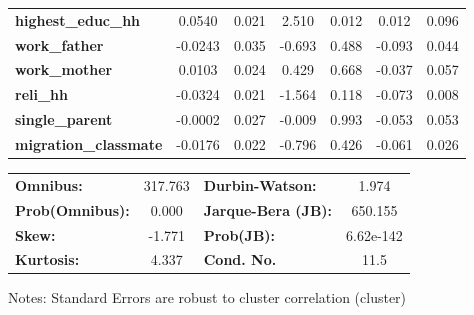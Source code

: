 \begin{center}
\begin{tabular}{lcccccc}
\textbf{highest\_educ\_hh}    &       0.0540  &        0.021     &     2.510  &         0.012        &        0.012    &        0.096     \\
\textbf{work\_father}         &      -0.0243  &        0.035     &    -0.693  &         0.488        &       -0.093    &        0.044     \\
\textbf{work\_mother}         &       0.0103  &        0.024     &     0.429  &         0.668        &       -0.037    &        0.057     \\
\textbf{reli\_hh}             &      -0.0324  &        0.021     &    -1.564  &         0.118        &       -0.073    &        0.008     \\
\textbf{single\_parent}       &      -0.0002  &        0.027     &    -0.009  &         0.993        &       -0.053    &        0.053     \\
\textbf{migration\_classmate} &      -0.0176  &        0.022     &    -0.796  &         0.426        &       -0.061    &        0.026     \\
\bottomrule
\end{tabular}
\begin{tabular}{lclc}
\textbf{Omnibus:}       & 317.763 & \textbf{  Durbin-Watson:     } &     1.974  \\
\textbf{Prob(Omnibus):} &   0.000 & \textbf{  Jarque-Bera (JB):  } &   650.155  \\
\textbf{Skew:}          &  -1.771 & \textbf{  Prob(JB):          } & 6.62e-142  \\
\textbf{Kurtosis:}      &   4.337 & \textbf{  Cond. No.          } &      11.5  \\
\bottomrule
\end{tabular}
\end{center}

Notes: \newline
 [1] Standard Errors are robust to cluster correlation (cluster)